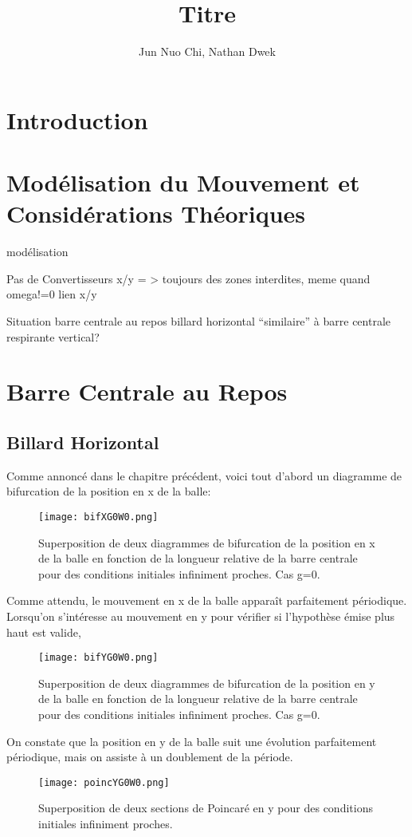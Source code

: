 \documentclass[a4paper]{report}
\title{Titre}
\author{Jun Nuo Chi, Nathan Dwek}
\begin{document}
\maketitle
\tableofcontents
\begin{abstract}

\end{abstract}

\chapter{Introduction}


\chapter{Modélisation du Mouvement et Considérations Théoriques}

modélisation

Pas de Convertisseurs x/y = > toujours des zones interdites, meme quand omega!=0
lien x/y


Situation barre centrale au repos billard horizontal ``similaire'' à barre centrale respirante vertical?

\chapter{Barre Centrale au Repos}

\section{Billard Horizontal}
Comme annoncé dans le chapitre précédent, voici tout d'abord un diagramme de bifurcation de la position en x de la balle:
\begin{figure}[h!]
   \texttt{[image: bifXG0W0.png]}
      \caption[Diagramme de bifurcation en x: g=0 ]{Superposition de deux diagrammes de bifurcation de la position en x de la balle en fonction de la longueur relative de la barre centrale pour des conditions initiales infiniment proches. Cas g=0.}
\end{figure}

Comme attendu, le mouvement en x de la balle apparaît parfaitement périodique. Lorsqu'on s'intéresse au mouvement en y pour vérifier si l'hypothèse émise plus haut est valide,
\begin{figure}[h!]
   \texttt{[image: bifYG0W0.png]}
      \caption[Diagramme de bifurcation en y: g=0 ]{Superposition de deux diagrammes de bifurcation de la position en y de la balle en fonction de la longueur relative de la barre centrale pour des conditions initiales infiniment proches. Cas g=0.}
\end{figure}
On constate que la position en y de la balle suit une évolution parfaitement périodique, mais on assiste à un doublement de la période.
\begin{figure}[H]
   \texttt{[image: poincYG0W0.png]}
      \caption[Section de Poincaré en y: g=0 ]{Superposition de deux sections de Poincaré en y pour des conditions initiales infiniment proches.}
\end{figure}
\end{document}
